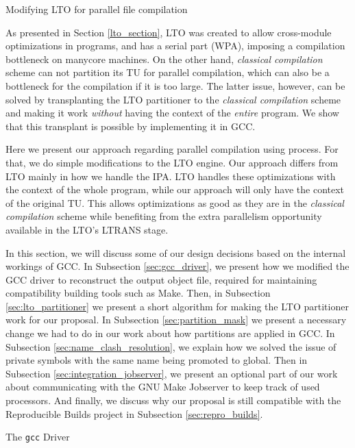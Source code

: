 \begin{section}{Modifying LTO for parallel file compilation}\label{sec:parallel_lto}

As presented in Section \ref{lto_section}, LTO was created to allow
cross-module optimizations in programs, and has a serial part (WPA), imposing a
compilation bottleneck on manycore machines. On the other hand, \emph{classical
compilation} scheme can not partition its TU for parallel compilation, which
can also be a bottleneck for the compilation if it is too large.  The latter
issue, however, can be solved by transplanting the LTO partitioner to the
\emph{classical compilation} scheme and making it work \textit{without} having
the context of the \textit{entire} program. We show that this transplant is
possible by implementing it in GCC.

Here we present our approach regarding parallel compilation using process. For
that, we do simple modifications to the LTO engine.  Our approach differs from
LTO mainly in how we handle the IPA.  LTO handles these optimizations with the
context of the whole program, while our approach will only have the context of
the original TU.  This allows optimizations as good as they are in the
\emph{classical compilation} scheme while benefiting from the extra parallelism
opportunity available in the LTO's LTRANS stage.

In this section, we will discuss some of our design decisions based on the
internal workings of GCC. In Subsection \ref{sec:gcc_driver}, we present how we
modified the GCC driver to reconstruct the output object file, required for
maintaining compatibility building tools such as Make. Then, in
Subsection \ref{sec:lto_partitioner} we present a short algorithm for making
the LTO partitioner work for our proposal. In Subsection
\ref{sec:partition_mask} we present a necessary change we had to do in our work
about how partitions are applied in GCC. In
Subsection \ref{sec:name_clash_resolution}, we explain how we solved the issue
of private symbols with the same name being promoted to global.
Then in Subsection \ref{sec:integration_jobserver}, we present an optional part
of our work about communicating with the GNU Make Jobserver to keep track of
used processors. And finally, we discuss why our proposal is still compatible
with the Reproducible Builds project in Subsection \ref{sec:repro_builds}.

\begin{subsection}{The \texttt{gcc} Driver}\label{sec:gcc_driver}


\end{subsection}
\end{section}
